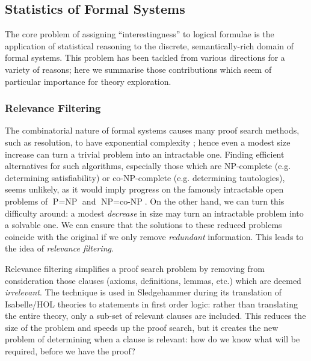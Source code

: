 \subsection{Statistics of Formal Systems}

The core problem of assigning ``interestingness'' to logical formulae is the
application of statistical reasoning to the discrete, semantically-rich domain
of formal systems. This problem has been tackled from various directions for a
variety of reasons; here we summarise those contributions which seem of
particular importance for theory exploration.

\subsubsection{Relevance Filtering}
\label{sec:relevance}

\cite{kuhlwein2012overview}

The combinatorial nature of formal systems causes many proof search methods,
such as resolution, to have exponential complexity
\cite{haken1985intractability}; hence even a modest size increase can turn a
trivial problem into an intractable one. Finding efficient alternatives for such
algorithms, especially those which are NP-complete (e.g. determining
satisfiability) or co-NP-complete (e.g. determining tautologies), seems
unlikely, as it would imply progress on the famously intractable open problems
of $\text{P} = \text{NP}$ and $\text{NP} = \text{co-NP}$. On the other hand, we
can turn this difficulty around: a modest \emph{decrease} in size may turn an
intractable problem into a solvable one. We can ensure that the solutions to
these reduced problems coincide with the original if we only remove
\emph{redundant} information. This leads to the idea of \emph{relevance
  filtering}.

Relevance filtering simplifies a proof search problem by removing from
consideration those clauses (axioms, definitions, lemmas, etc.) which are deemed
\emph{irrelevant}. The technique is used in Sledgehammer during its translation
of Isabelle/HOL theories to statements in first order logic: rather than
translating the entire theory, only a sub-set of relevant clauses are
included. This reduces the size of the problem and speeds up the proof search,
but it creates the new problem of determining when a clause is relevant: how do
we know what will be required, before we have the proof?

